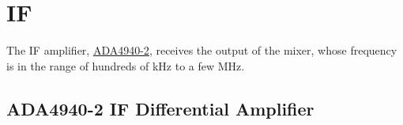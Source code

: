 \section{IF}
\label{sec:if}

The IF amplifier,
\href{http://www.analog.com/media/en/technical-documentation/data-sheets/ADA4940-1_4940-2.pdf}{ADA4940-2},
receives the output of the mixer, whose frequency is in the range of hundreds of kHz to a few MHz.

\subsection{ADA4940-2 IF Differential Amplifier}
\label{sec:ada4940-2}
